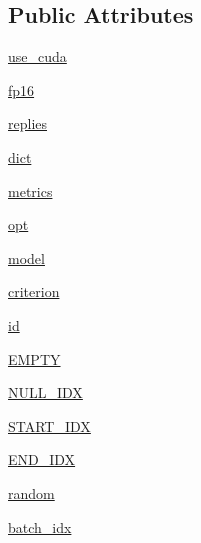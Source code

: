\subsection*{Public Attributes}
\begin{DoxyCompactItemize}
\item 
\hyperlink{classparlai_1_1core_1_1torch__agent_1_1TorchAgent_a10b8d2605e619d5d3dc9f67777cb190a}{use\+\_\+cuda}
\item 
\hyperlink{classparlai_1_1core_1_1torch__agent_1_1TorchAgent_aa6f916e01d876679b529a893ad4f52f6}{fp16}
\item 
\hyperlink{classparlai_1_1core_1_1torch__agent_1_1TorchAgent_a5dd17721e788aafd51cd5af7bf7fc967}{replies}
\item 
\hyperlink{classparlai_1_1core_1_1torch__agent_1_1TorchAgent_abebf29c0bb956bbc5ccc02777d2af3dd}{dict}
\item 
\hyperlink{classparlai_1_1core_1_1torch__agent_1_1TorchAgent_a392ed66573001dfa2846d5042e8fc5a5}{metrics}
\item 
\hyperlink{classparlai_1_1core_1_1torch__agent_1_1TorchAgent_a785bb920cf8c8afc3e9bf6a8b77e335a}{opt}
\item 
\hyperlink{classparlai_1_1core_1_1torch__agent_1_1TorchAgent_afe40410d2e3b2565ecd27441266011fc}{model}
\item 
\hyperlink{classparlai_1_1core_1_1torch__agent_1_1TorchAgent_a13d46ae8aed6052679b62c3961a4de62}{criterion}
\item 
\hyperlink{classparlai_1_1core_1_1torch__agent_1_1TorchAgent_a4ac66a09c1c164ea08f4b257c61c38a0}{id}
\item 
\hyperlink{classparlai_1_1core_1_1torch__agent_1_1TorchAgent_a3a80083f0e34d8abc15b50123efec884}{E\+M\+P\+TY}
\item 
\hyperlink{classparlai_1_1core_1_1torch__agent_1_1TorchAgent_a95cedd561757c9fc10dbf3a956e7f912}{N\+U\+L\+L\+\_\+\+I\+DX}
\item 
\hyperlink{classparlai_1_1core_1_1torch__agent_1_1TorchAgent_a2018afae9938937f80b61475314012cd}{S\+T\+A\+R\+T\+\_\+\+I\+DX}
\item 
\hyperlink{classparlai_1_1core_1_1torch__agent_1_1TorchAgent_a31bb7c8bf380660ee4e3822756563599}{E\+N\+D\+\_\+\+I\+DX}
\item 
\hyperlink{classparlai_1_1core_1_1torch__agent_1_1TorchAgent_a1ca476189900643fab04d1ac0ebfc719}{random}
\item 
\hyperlink{classparlai_1_1core_1_1torch__agent_1_1TorchAgent_ae67e7dc97dff3c46522712945ca23f50}{batch\+\_\+idx}
\item 

\end{DoxyCompactItemize}
